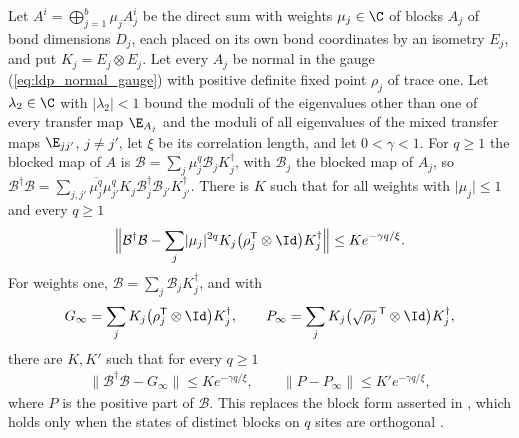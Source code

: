 \begin{lemma}
    \label{lem:ldp_overlapping_positive_part}
    \leanok
    Let $A^i=\bigoplus_{j=1}^b\mu_jA_j^i$ be the direct sum with weights $\mu_j\in\C$ of
    blocks $A_j$ of bond dimensions $D_j$, each placed on its own bond coordinates by an
    isometry $E_j$, and put $K_j=E_j\otimes E_j$. Let every $A_j$ be normal in the
    gauge (\ref{eq:ldp_normal_gauge}) with positive definite fixed point $\rho_j$ of
    trace one. Let $\lambda_2\in\C$ with $\lvert\lambda_2\rvert<1$ bound the moduli of
    the eigenvalues other than one of every transfer map $\E_{A_j}$ and the moduli of
    all eigenvalues of the mixed transfer maps $\E_{jj'}$, $j\neq j'$, let $\xi$ be its
    correlation length, and let $0<\gamma<1$. For $q\geq1$ the blocked map of $A$ is
    $\mathcal B=\sum_j\mu_j^q\mathcal B_jK_j^\dagger$, with $\mathcal B_j$ the blocked map
    of $A_j$, so
    $\mathcal B^\dagger\mathcal B=\sum_{j,j'}\overline{\mu_j^q}\mu_{j'}^q
        K_j\mathcal B_j^\dagger\mathcal B_{j'}K_{j'}^\dagger$. There is $K$ such that for
    all weights with $\lvert\mu_j\rvert\leq1$ and every $q\geq1$
    \begin{align*}
        \Bigl\lVert\mathcal B^\dagger\mathcal B-\sum_j\lvert\mu_j\rvert^{2q}
        K_j\bigl(\rho_j^{\mathsf T}\otimes\Id\bigr)K_j^\dagger\Bigr\rVert
        \leq Ke^{-\gamma q/\xi}.
    \end{align*}
    For weights one, $\mathcal B=\sum_j\mathcal B_jK_j^\dagger$, and with
    \begin{align*}
        G_\infty=\sum_jK_j\bigl(\rho_j^{\mathsf T}\otimes\Id\bigr)K_j^\dagger,\qquad
        P_\infty=\sum_jK_j\bigl(\sqrt{\rho_j}^{\,\mathsf T}\otimes\Id\bigr)K_j^\dagger,
    \end{align*}
    there are $K,K'$ such that for every $q\geq1$
    \begin{align*}
        \lVert\mathcal B^\dagger\mathcal B-G_\infty\rVert\leq Ke^{-\gamma q/\xi},
        \qquad
        \lVert P-P_\infty\rVert\leq K'e^{-\gamma q/\xi},
    \end{align*}
    where $P$ is the positive part of $\mathcal B$. This replaces the block form
    asserted in \cite[eq.~(S5)]{Malz2024Preparation}, which holds only when the
    states of distinct blocks on $q$ sites are orthogonal
    \cite{gap:mswc24_block_form_mixed_overlap}.
\end{lemma}
